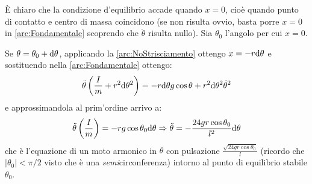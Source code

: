 \documentclass[../main.tex]{subfiles}
\begin{document}
È chiaro che la condizione d'equilibrio accade quando $x=0$, cioè quando punto di contatto e centro di massa coincidono (se non risulta ovvio, basta porre $x=0$ in \cref{arc:Fondamentale} scoprendo che $\ddot{\theta}$ risulta nullo).
Sia $\theta_0$ l'angolo per cui $x=0$. 

Se $\theta=\theta_0+\mathrm{d}\theta$, applicando la \cref{arc:NoStrisciamento} ottengo $x=-r\mathrm{d}\theta$ e sostituendo nella \cref{arc:Fondamentale} ottengo:
\begin{equation*}
	\ddot{\theta}\left(\frac Im+r^2\mathrm{d}\theta^2\right)=-r\mathrm{d}\theta g\cos\theta+r^2\mathrm{d}\theta^2\dot{\theta}^2
\end{equation*}
e approssimandola al prim'ordine arrivo a:
\begin{equation*}
	\ddot{\theta}\left(\frac Im\right)=-rg\cos\theta_0\mathrm{d}\theta \Rightarrow 
	\ddot{\theta}=-\frac{24gr\cos\theta_0}{l^2}\mathrm{d}\theta
\end{equation*}
che è l'equazione di un moto armonico in $\theta$ con pulsazione $\displaystyle\frac{\sqrt{24gr\cos\theta_0}}l$ (ricordo che $|\theta_0|<\pi/2$ visto che è una \emph{semi}circonferenza) intorno al punto di equilibrio stabile $\theta_0$. 
\end{document}
